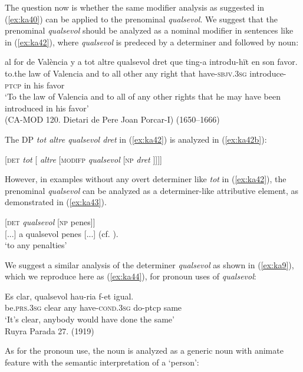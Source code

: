 \documentclass[output=paper,colorlinks,citecolor=brown]{langscibook}
\begin{document}
The question now is whether the same modifier analysis as suggested in (\ref{ex:ka40}) can be applied to the prenominal \textit{qualsevol}. We suggest that the prenominal \textit{qualsevol} should be analyzed as a nominal modifier in sentences like in (\ref{ex:ka42}), where \textit{qualsevol} is predeced by a determiner and followed by noun:

\ea\label{ex:ka42}
    \gll al for de València y a tot altre qualsevol dret que ting-a introdu-hït en son favor.\\
    to.the law of Valencia and to all other any right that have-\textsc{sbjv.3sg} introduce-\textsc{ptcp} in his favor\\
    \glt ‘To the law of Valencia and to all of any other rights that he may have been introduced in his favor’\\
    (CA-MOD 120. Dietari de Pere Joan Porcar-I) (1650--1666)
\z

The DP \textit{tot altre qualsevol dret} in (\ref{ex:ka42}) is analyzed in (\ref{ex:ka42b}):

\ea \label{ex:ka42b}
    [\textsc{det} \textit{tot} [ \textit{altre} [\textsc{modifp} \textit{qualsevol} [\textsc{np} \textit{dret} ]]]]
\z

\begin{sloppypar}
However, in examples without any overt determiner like \textit{tot} in (\ref{ex:ka42}), the prenominal \textit{qualsevol} can be analyzed as a determiner-like attributive element, as demonstrated in (\ref{ex:ka43}).
\end{sloppypar}

\ea \label{ex:ka43}
    [\textsc{det} \textit{qualsevol} [\textsc{np} penes]]\\
    {[}...{]} a qualsevol penes {[}...{]} (cf.  ).\\
    ‘to any penalties’
\z

We suggest a similar analysis of the determiner \textit{qualsevol} as shown in (\ref{ex:ka9}), which we reproduce here as (\ref{ex:ka44}), for pronoun uses of \textit{qualsevol}:

\ea %
\label{ex:ka44}
    \gll Es clar, qualsevol hau-ria f-et igual.\\
    be.\textsc{prs.3sg} clear any have-\textsc{cond.3sg} do-{ptcp} same\\
    \glt ‘It’s clear, anybody would have done the same’\\
    Ruyra Parada 27. (1919)
\z

As for the pronoun use, the noun is analyzed as a generic noun with animate feature with the semantic interpretation of a ‘person’: 
\end{document}
